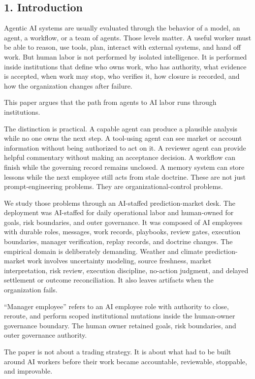 \documentclass[
]{article}
\begin{document}
\subsection{1. Introduction}\label{introduction}

Agentic AI systems are usually evaluated through the behavior of a model, an agent, a workflow, or a team of agents. Those levels matter. A useful worker must be able to reason, use tools, plan, interact with external systems, and hand off work. But human labor is not performed by isolated intelligence. It is performed inside institutions that define who owns work, who has authority, what evidence is accepted, when work may stop, who verifies it, how closure is recorded, and how the organization changes after failure.

This paper argues that the path from agents to AI labor runs through institutions.

The distinction is practical. A capable agent can produce a plausible analysis while no one owns the next step. A tool-using agent can see market or account information without being authorized to act on it. A reviewer agent can provide helpful commentary without making an acceptance decision. A workflow can finish while the governing record remains unclosed. A memory system can store lessons while the next employee still acts from stale doctrine. These are not just prompt-engineering problems. They are organizational-control problems.

We study those problems through an AI-staffed prediction-market desk. The deployment was AI-staffed for daily operational labor and human-owned for goals, risk boundaries, and outer governance. It was composed of AI employees with durable roles, messages, work records, playbooks, review gates, execution boundaries, manager verification, replay records, and doctrine changes. The empirical domain is deliberately demanding. Weather and climate prediction-market work involves uncertainty modeling, source freshness, market interpretation, risk review, execution discipline, no-action judgment, and delayed settlement or outcome reconciliation. It also leaves artifacts when the organization fails.

``Manager employee'' refers to an AI employee role with authority to close, reroute, and perform scoped institutional mutations inside the human-owner governance boundary. The human owner retained goals, risk boundaries, and outer governance authority.

The paper is not about a trading strategy. It is about what had to be built around AI workers before their work became accountable, reviewable, stoppable, and improvable.
\end{document}

